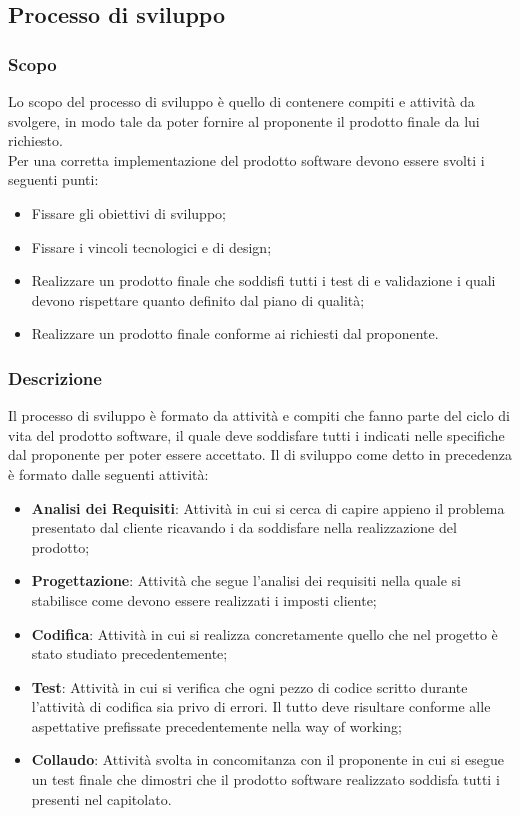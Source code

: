 

\subsection{Processo di sviluppo}
\subsubsection{Scopo}
Lo scopo del processo di sviluppo è quello di contenere compiti e attività da svolgere, in modo tale da poter fornire al proponente il prodotto finale da lui richiesto.\\
Per una corretta implementazione del prodotto software devono essere svolti i seguenti punti: 
\begin{itemize}
	\item Fissare gli obiettivi di sviluppo;
	\item Fissare i vincoli tecnologici e di design;
	\item Realizzare un prodotto finale che soddisfi tutti i test di  e validazione i quali devono rispettare quanto definito dal piano di qualità;
	\item Realizzare un prodotto finale conforme ai  richiesti dal proponente.
\end{itemize}
\subsubsection{Descrizione}
Il processo di sviluppo è formato da attività e compiti che fanno parte del ciclo di vita del prodotto software, il quale deve soddisfare tutti i  indicati nelle specifiche dal proponente per poter essere accettato.		
Il  di sviluppo come detto in precedenza è formato dalle seguenti attività:
\begin{itemize}
	\item \textbf{Analisi dei Requisiti}: Attività in cui si cerca di capire appieno il problema presentato dal cliente ricavando i  da soddisfare nella realizzazione del prodotto;
	\item \textbf{Progettazione}: Attività che segue l'analisi dei requisiti nella quale si stabilisce come devono essere realizzati i  imposti cliente;
	\item \textbf{Codifica}: Attività in cui si realizza concretamente quello che nel progetto è stato  studiato precedentemente;
	\item \textbf{Test}: Attività in cui si verifica che ogni pezzo di codice scritto durante l'attività di codifica sia privo di errori. Il tutto deve risultare conforme alle aspettative prefissate precedentemente nella way of working;
	\item \textbf{Collaudo}: Attività svolta in concomitanza con il proponente in cui si esegue un test finale che dimostri che il prodotto software realizzato soddisfa tutti i  presenti nel capitolato.
\end{itemize}





